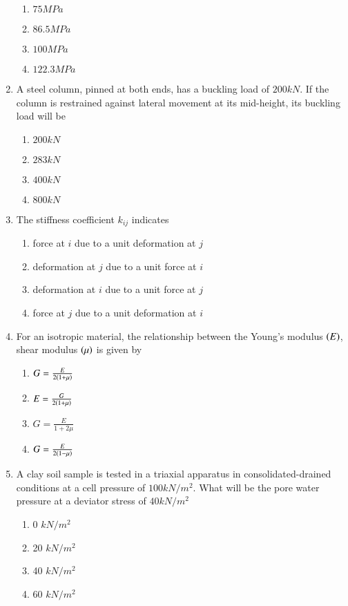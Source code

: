\documentclass[journal]{IEEEtran}
\begin{document}
\begin{enumerate}
\begin{enumerate}
			\item $75 MPa$
			\item $86.5 MPa$
			\item $100 MPa$
			\item $122.3 MPa$
		\end{enumerate}
	\item
	A steel column, pinned at both ends, has a buckling load of $200 kN$. If the column is restrained against lateral movement at its mid-height, its buckling load will be 
		\begin{enumerate}
			\item $200 kN$
			\item $283 kN$
			\item $400 kN$
			\item $800 kN$
		\end{enumerate}
	\item
	The stiffness coefficient $k_{ij}$ indicates
		\begin{enumerate}
			\item force at $i$ due to a unit deformation at $j$
			\item deformation at $j$ due to a unit force at $i$
			\item deformation at $i$ due to a unit force at $j$
			\item force at $j$ due to a unit deformation at $i$
		\end{enumerate}
	\item
	For an isotropic material, the relationship between the Young's modulus $\left(E\right)$, shear modulus $\left(\mu\right)$ is given by 
		\begin{enumerate}
			\item $G = \frac{E}{2\left(1+\mu\right)}$
			\item $E = \frac{G}{2\left(1+\mu\right)}$
			\item $G = \frac{E}{1 + 2\mu}$
			\item $G = \frac{E}{2\left(1-\mu\right)}$
		\end{enumerate}
	\item
	A clay soil sample is tested in a triaxial apparatus in consolidated-drained conditions at a cell pressure of $100 kN/m^2$. What will be the pore water pressure at a deviator stress of $40 kN/m^2$
		\begin{enumerate}
			\item 0 $kN/m^2$
			\item 20 $kN/m^2$
			\item 40 $kN/m^2$
			\item 60 $kN/m^2$

\end{enumerate}
\end{enumerate}
\end{document}
